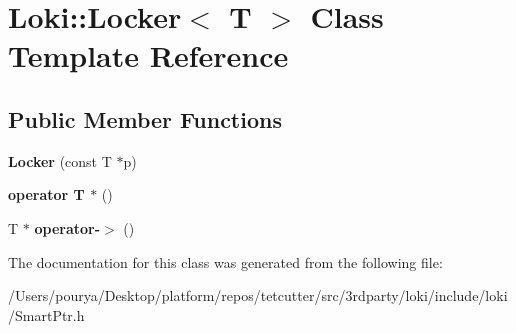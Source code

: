 \hypertarget{classLoki_1_1Locker}{}\section{Loki\+:\+:Locker$<$ T $>$ Class Template Reference}
\label{classLoki_1_1Locker}
\subsection*{Public Member Functions}
\begin{DoxyCompactItemize}
\item 
\hypertarget{classLoki_1_1Locker_a204459d9a37027531230d67e923dafff}{}{\bfseries Locker} (const T $\ast$p)\label{classLoki_1_1Locker_a204459d9a37027531230d67e923dafff}

\item 
\hypertarget{classLoki_1_1Locker_ac13a7d95aa17e4e4ea44267ec44f7315}{}{\bfseries operator T $\ast$} ()\label{classLoki_1_1Locker_ac13a7d95aa17e4e4ea44267ec44f7315}

\item 
\hypertarget{classLoki_1_1Locker_a7e5c61b2e7f9fdd1de7ad0a1500e7e8b}{}T $\ast$ {\bfseries operator-\/$>$} ()\label{classLoki_1_1Locker_a7e5c61b2e7f9fdd1de7ad0a1500e7e8b}

\end{DoxyCompactItemize}


The documentation for this class was generated from the following file\+:\begin{DoxyCompactItemize}
\item 
/\+Users/pourya/\+Desktop/platform/repos/tetcutter/src/3rdparty/loki/include/loki/Smart\+Ptr.\+h\end{DoxyCompactItemize}
